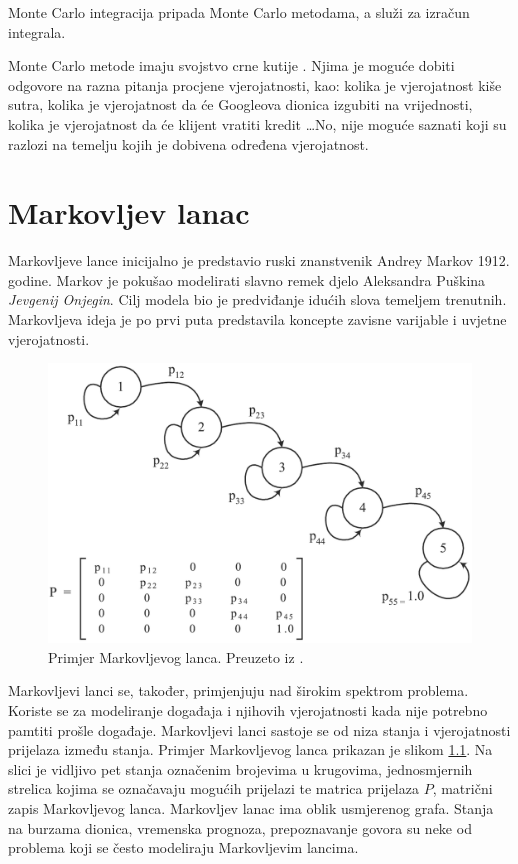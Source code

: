 Monte Carlo integracija pripada Monte Carlo metodama, a služi za izračun integrala. 

Monte Carlo metode imaju svojstvo crne kutije . Njima je moguće dobiti odgovore na razna pitanja procjene vjerojatnosti, kao: kolika je vjerojatnost kiše sutra, kolika je vjerojatnost da će Googleova dionica izgubiti na vrijednosti, kolika je vjerojatnost da će klijent vratiti kredit \dots No, nije moguće saznati koji su razlozi na temelju kojih je dobivena određena vjerojatnost. 

\chapter{Markovljev lanac}

Markovljeve lance inicijalno je predstavio ruski znanstvenik Andrey Markov 1912. godine. Markov je pokušao modelirati slavno remek djelo Aleksandra Puškina \textit{Jevgenij Onjegin}. Cilj modela bio je predviđanje idućih slova temeljem trenutnih. Markovljeva ideja je po prvi puta predstavila koncepte zavisne varijable i uvjetne vjerojatnosti.

\begin{figure}
\centering
\includegraphics[scale=1]{markov_chain_example.png}
\caption{Primjer Markovljevog lanca. Preuzeto iz \citep{wirahadikusumah2003application}.}
\label{fig:markov_example}
\end{figure}

Markovljevi lanci se, također, primjenjuju nad širokim spektrom problema. Koriste se za modeliranje događaja i njihovih vjerojatnosti kada nije potrebno pamtiti prošle događaje. Markovljevi lanci sastoje se od niza stanja i vjerojatnosti prijelaza između stanja. Primjer Markovljevog lanca prikazan je slikom \ref{fig:markov_example}. Na slici je vidljivo pet stanja označenim brojevima u krugovima, jednosmjernih strelica kojima se označavaju mogućih prijelazi te matrica prijelaza $P$, matrični zapis Markovljevog lanca. Markovljev lanac ima oblik usmjerenog grafa. Stanja na burzama dionica, vremenska prognoza, prepoznavanje govora su neke od problema koji se često modeliraju Markovljevim 
lancima. 

